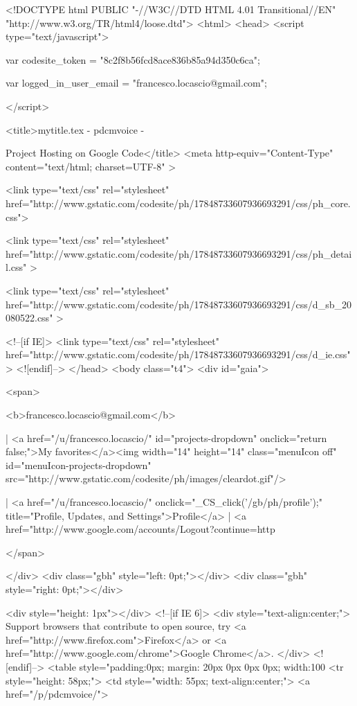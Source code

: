 


<!DOCTYPE html PUBLIC "-//W3C//DTD HTML 4.01 Transitional//EN" "http://www.w3.org/TR/html4/loose.dtd">
<html>
<head>
 <script type="text/javascript">
 
 
 
 var codesite_token = "8c2f8b56fcd8ace836b85a94d350c6ca";
 
 
 var logged_in_user_email = "francesco.locascio@gmail.com";
 
 </script>
 
 
 <title>mytitle.tex - 
 pdcmvoice -
 
 Project Hosting on Google Code</title>
 <meta http-equiv="Content-Type" content="text/html; charset=UTF-8" >
 
 <link type="text/css" rel="stylesheet" href="http://www.gstatic.com/codesite/ph/17848733607936693291/css/ph_core.css">
 
 <link type="text/css" rel="stylesheet" href="http://www.gstatic.com/codesite/ph/17848733607936693291/css/ph_detail.css" >
 
 
 <link type="text/css" rel="stylesheet" href="http://www.gstatic.com/codesite/ph/17848733607936693291/css/d_sb_20080522.css" >
 
 
 
<!--[if IE]>
 <link type="text/css" rel="stylesheet" href="http://www.gstatic.com/codesite/ph/17848733607936693291/css/d_ie.css" >
<![endif]-->
</head>
<body class="t4">
 <div id="gaia">
 
 <span>
 
 <b>francesco.locascio@gmail.com</b>
 
 
 | <a href="/u/francesco.locascio/" id="projects-dropdown" onclick="return false;">My favorites</a><img width="14" height="14" class="menuIcon off" id="menuIcon-projects-dropdown" src="http://www.gstatic.com/codesite/ph/images/cleardot.gif"/>
 
 | <a href="/u/francesco.locascio/" onclick="_CS_click('/gb/ph/profile');" title="Profile, Updates, and Settings">Profile</a>
 | <a href="http://www.google.com/accounts/Logout?continue=http%
 
 </span>

 </div>
 <div class="gbh" style="left: 0pt;"></div>
 <div class="gbh" style="right: 0pt;"></div>
 
 
 <div style="height: 1px"></div>
<!--[if IE 6]>
<div style="text-align:center;">
Support browsers that contribute to open source, try <a href="http://www.firefox.com">Firefox</a> or <a href="http://www.google.com/chrome">Google Chrome</a>.
</div>
<![endif]-->
 <table style="padding:0px; margin: 20px 0px 0px 0px; width:100%
 <tr style="height: 58px;">
 <td style="width: 55px; text-align:center;">
 <a href="/p/pdcmvoice/">
 

